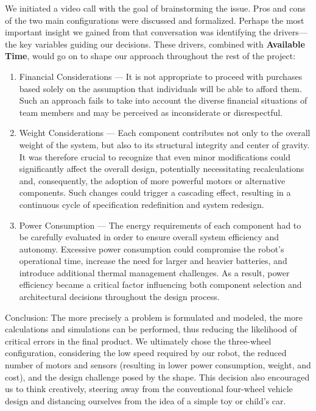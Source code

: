 \documentclass{article}
\begin{document}
    We initiated a video call with the goal of brainstorming the issue. Pros and cons of the two main configurations were discussed and formalized. Perhaps the most important insight we gained from that conversation was identifying the drivers—the key variables guiding our decisions. These drivers, combined with \textbf{Available Time}, would go on to shape our approach throughout the rest of the project: 

    \begin{enumerate}
        \item Financial Considerations — It is not appropriate to proceed with purchases based solely on the assumption that individuals will be able to afford them. Such an approach fails to take into account the diverse financial situations of team members and may be perceived as inconsiderate or disrespectful.
        \item Weight Considerations — Each component contributes not only to the overall weight of the system, but also to its structural integrity and center of gravity. It was therefore crucial to recognize that even minor modifications could significantly affect the overall design, potentially necessitating recalculations and, consequently, the adoption of more powerful motors or alternative components. Such changes could trigger a cascading effect, resulting in a continuous cycle of specification redefinition and system redesign.
        \item Power Consumption — The energy requirements of each component had to be carefully evaluated in order to ensure overall system efficiency and autonomy. Excessive power consumption could compromise the robot’s operational time, increase the need for larger and heavier batteries, and introduce additional thermal management challenges. As a result, power efficiency became a critical factor influencing both component selection and architectural decisions throughout the design process.
    \end{enumerate}

    Conclusion: The more precisely a problem is formulated and modeled, the more calculations and simulations can be performed, thus reducing the likelihood of critical errors in the final product. We ultimately chose the three-wheel configuration, considering the low speed required by our robot, the reduced number of motors and sensors (resulting in lower power consumption, weight, and cost), and the design challenge posed by the shape. This decision also encouraged us to think creatively, steering away from the conventional four-wheel vehicle design and distancing ourselves from the idea of a simple toy or child’s car.
\end{document}
